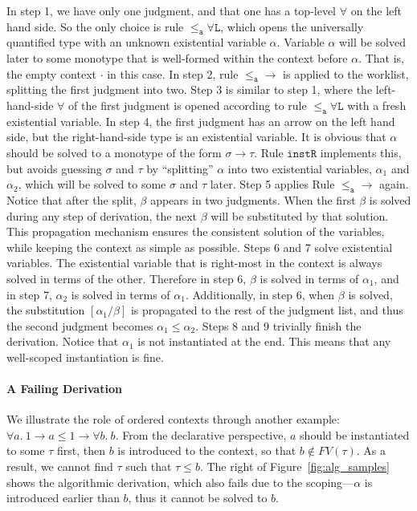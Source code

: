 In step 1, we have only one judgment, and that one has a top-level $\forall$ on
the left hand side. So the only choice is rule $\mathtt{{\le_a}\forall L}$, which
opens the universally quantified type with an unknown existential variable
$\alpha$. Variable $\alpha$ will be solved later to some monotype that is well-formed
within the context before $\alpha$. That is, the empty context $\cdot$ in this
case.
In step 2, rule $\mathtt{{\le_a}{\to}}$ is applied to the worklist,
splitting the first judgment into two.
Step 3 is similar to step 1, where the left-hand-side $\forall$ of the first
judgment is opened according to rule $\mathtt{{\le_a}\forall L}$ with a fresh
existential variable.
In step 4, the first judgment has an arrow on the left hand side, but the
right-hand-side type is an existential variable. It is obvious
that $\alpha$ should be solved to a monotype of the form
$\sigma \to \tau$. Rule $\mathtt{instR}$ implements this, but avoids
guessing $\sigma$ and $\tau$ by ``splitting'' $\alpha$ into two existential
variables, $\alpha_1$ and $\alpha_2$, which will be solved to some $\sigma$ and
$\tau$ later.
Step 5 applies Rule $\mathtt{{\le_a}{\to}}$ again. Notice that after the
split, $\beta$ appears in two judgments. When the first $\beta$ is solved
during any step of derivation, the next $\beta$ will be substituted by that
solution.  This propagation mechanism ensures the consistent solution of the
variables, while keeping the context as simple as possible.
Steps 6 and 7 solve existential variables. The existential
variable that is right-most in the context is always solved in terms of the other. Therefore in step 6,
$\beta$ is solved in terms of $\alpha_1$, and in step 7, $\alpha_2$ is solved in terms of $\alpha_1$.
Additionally, in step 6, when $\beta$ is solved, the substitution $[\alpha_1 /
\beta]$ is propagated to the rest of the judgment list, and thus the second
judgment becomes $\alpha_1\le\alpha_2$.
Steps 8 and 9 trivially finish the derivation. Notice that $\alpha_1$ is not
instantiated at the end. This means that any well-scoped instantiation is fine.

\paragraph{A Failing Derivation} We illustrate the role of ordered contexts through another example: $\forall a.\ 1\to a \le 1\to \forall b.\ b$. From the declarative perspective, $a$ should be instantiated to some $\tau$ first, then $b$ is introduced to the context, so that $b\notin FV(\tau)$. As a result, we cannot find $\tau$ such that $\tau \le b$. The right of Figure~\ref{fig:alg_samples} shows the algorithmic derivation, which also fails due to the scoping---$\alpha$ is introduced earlier than $b$, thus it cannot be solved to $b$.





